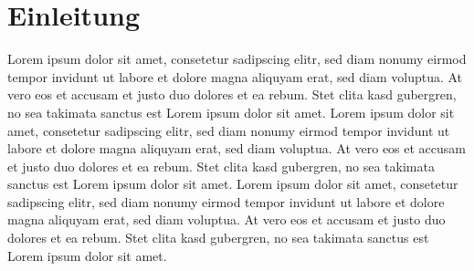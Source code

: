 \chapter{Einleitung}
\label{scr:Einleitung}
Lorem ipsum dolor sit amet, consetetur sadipscing elitr, sed diam nonumy eirmod tempor invidunt ut labore et dolore magna aliquyam erat, sed diam voluptua. At vero eos et accusam et justo duo dolores et ea rebum. Stet clita kasd gubergren, no sea takimata sanctus est Lorem ipsum dolor sit amet. Lorem ipsum dolor sit amet, consetetur sadipscing elitr, sed diam nonumy eirmod tempor invidunt ut labore et dolore magna aliquyam erat, sed diam voluptua. At vero eos et accusam et justo duo dolores et ea rebum. Stet clita kasd gubergren, no sea takimata sanctus est Lorem ipsum dolor sit amet. Lorem ipsum dolor sit amet, consetetur sadipscing elitr, sed diam nonumy eirmod tempor invidunt ut labore et dolore magna aliquyam erat, sed diam voluptua. At vero eos et accusam et justo duo dolores et ea rebum. Stet clita kasd gubergren, no sea takimata sanctus est Lorem ipsum dolor sit amet.\par

